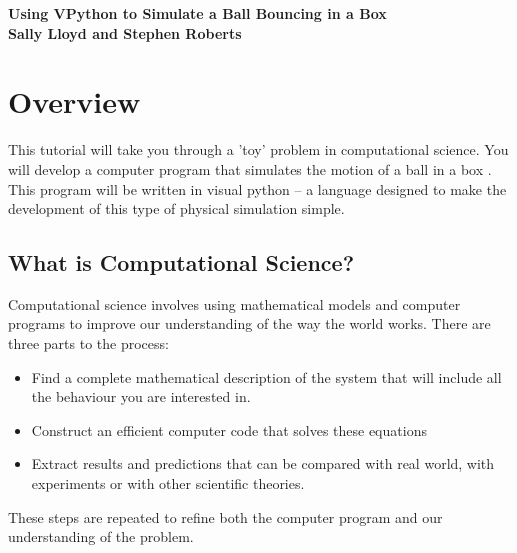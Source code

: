 \documentclass[12pt]{article}
\begin{document}
\begin{center}
\textbf{\large Using VPython to Simulate a Ball Bouncing in a
Box}\\
\textbf{Sally Lloyd and Stephen Roberts}
\end{center}

\section{Overview}
This tutorial will take you through a 'toy' problem in computational science.
You will develop a computer program that simulates the motion of a ball in a box .
This program will be written in visual python
-- a language designed to make the development of this type of physical simulation simple.

\subsection{What is Computational Science?}
Computational science involves using mathematical models and computer programs to improve our
understanding of the way the world works. There are three parts to the process:
\begin{itemize}
\item{Find a complete mathematical description of the system that will include all the
behaviour you are interested in.}
\item{Construct an efficient computer code that solves these equations }
\item{Extract results and predictions that can be compared with real world, with experiments
or with other scientific theories. }
\end{itemize}
These steps are repeated to refine both the computer program and our understanding of the problem.
\end{document}
